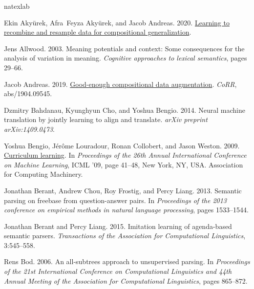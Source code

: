 \documentclass[11pt,a4paper]{article}
\begin{document}
\begin{thebibliography}{57}
\expandafter\ifx\csname natexlab\endcsname\relax\def\natexlab#1{#1}\fi

Ekin Akyürek, Afra~Feyza Akyürek, and Jacob Andreas. 2020.
\newblock \href {http://arxiv.org/abs/2010.03706} {Learning to recombine and
  resample data for compositional generalization}.

Jens Allwood. 2003.
\newblock Meaning potentials and context: Some consequences for the analysis of
  variation in meaning.
\newblock \emph{Cognitive approaches to lexical semantics}, pages 29--66.

Jacob Andreas. 2019.
\newblock \href {http://arxiv.org/abs/1904.09545} {Good-enough compositional
  data augmentation}.
\newblock \emph{CoRR}, abs/1904.09545.

Dzmitry Bahdanau, Kyunghyun Cho, and Yoshua Bengio. 2014.
\newblock Neural machine translation by jointly learning to align and
  translate.
\newblock \emph{arXiv preprint arXiv:1409.0473}.

Yoshua Bengio, J\'{e}r\^{o}me Louradour, Ronan Collobert, and Jason Weston.
  2009.
\newblock \href {https://doi.org/10.1145/1553374.1553380} {Curriculum
  learning}.
\newblock In \emph{Proceedings of the 26th Annual International Conference on
  Machine Learning}, ICML ’09, page 41–48, New York, NY, USA. Association
  for Computing Machinery.

Jonathan Berant, Andrew Chou, Roy Frostig, and Percy Liang. 2013.
\newblock Semantic parsing on freebase from question-answer pairs.
\newblock In \emph{Proceedings of the 2013 conference on empirical methods in
  natural language processing}, pages 1533--1544.

Jonathan Berant and Percy Liang. 2015.
\newblock Imitation learning of agenda-based semantic parsers.
\newblock \emph{Transactions of the Association for Computational Linguistics},
  3:545--558.

Rens Bod. 2006.
\newblock An all-subtrees approach to unsupervised parsing.
\newblock In \emph{Proceedings of the 21st International Conference on
  Computational Linguistics and 44th Annual Meeting of the Association for
  Computational Linguistics}, pages 865--872.


\end{thebibliography}
\end{document}
